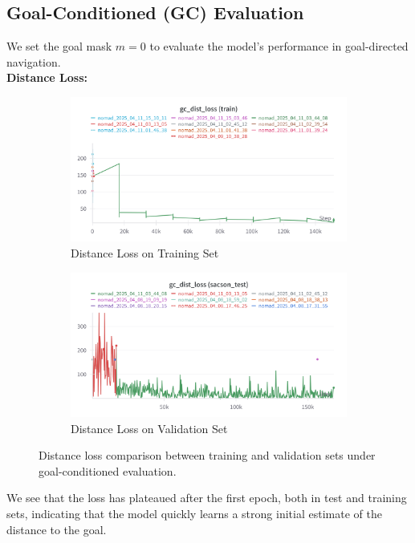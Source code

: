 \documentclass[12pt]{article}
\begin{document}
\subsection*{Goal-Conditioned (GC) Evaluation}
We set the goal mask $m = 0$ to evaluate the model's performance in goal-directed navigation.\\
\noindent \textbf{Distance Loss:}\\
\begin{figure}[H]
    \centering
    \begin{subfigure}[b]{0.48\textwidth}
        \centering
        \includegraphics[width=\textwidth]{images/gc_distloss_nomad.png}
        \caption{Distance Loss on Training Set}
        \label{fig:gc_dist_loss_train}
    \end{subfigure}
    \hfill
    \begin{subfigure}[b]{0.48\textwidth}
        \centering
        \includegraphics[width=\textwidth]{images/gc_dist_loss_test.png}
        \caption{Distance Loss on Validation Set}
        \label{fig:gc_dist_loss_val}
    \end{subfigure}
    \caption{Distance loss comparison between training and validation sets under goal-conditioned evaluation.}
\end{figure}
We see that the loss has plateaued after the first epoch, both in test and training sets, indicating that the model quickly learns a strong initial estimate of the distance to the goal.\\
\end{document}
